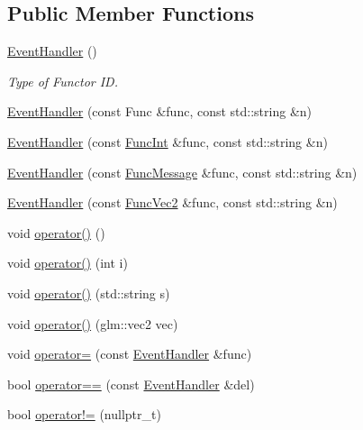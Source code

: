 \subsection*{Public Member Functions}
\begin{DoxyCompactItemize}
\item 
\hyperlink{class_event_handler_a8fe27b69582cce5c6a89a0b134bc8158}{Event\+Handler} ()
\begin{DoxyCompactList}\small\item\em Type of Functor I\+D. \end{DoxyCompactList}\item 
\hyperlink{class_event_handler_ac5aa9716cd85cf8d1a642b39da067c68}{Event\+Handler} (const Func \&func, const std\+::string \&n)
\item 
\hyperlink{class_event_handler_ab407fade3b0f1feb9e7db43007dcac0c}{Event\+Handler} (const \hyperlink{class_event_handler_afc053859d1bdb89bd10f01ff22c99fed}{Func\+Int} \&func, const std\+::string \&n)
\item 
\hyperlink{class_event_handler_a636fa04a3de981fad47973d8a4a1f419}{Event\+Handler} (const \hyperlink{class_event_handler_a21c76d0c722afe4925c87aa3544e2ce6}{Func\+Message} \&func, const std\+::string \&n)
\item 
\hyperlink{class_event_handler_aeb54e46cc16b35a2f3ced7cdc31f3d55}{Event\+Handler} (const \hyperlink{class_event_handler_a814f37c7df5b2bf170d82904b3e525d6}{Func\+Vec2} \&func, const std\+::string \&n)
\item 
void \hyperlink{class_event_handler_a45684d26fef24278c15a21894e64af18}{operator()} ()
\item 
void \hyperlink{class_event_handler_aaf68fb8408f4d2740d0086de802ac69e}{operator()} (int i)
\item 
void \hyperlink{class_event_handler_a4083d0f599c7558894810635e563cd8e}{operator()} (std\+::string s)
\item 
void \hyperlink{class_event_handler_a7c704b798b8b57610fbf194899915b28}{operator()} (glm\+::vec2 vec)
\item 
void \hyperlink{class_event_handler_a5a44f133d79f06b728b83ce005d88644}{operator=} (const \hyperlink{class_event_handler}{Event\+Handler} \&func)
\item 
bool \hyperlink{class_event_handler_a5a967210bc6305b30907418a92ce33bd}{operator==} (const \hyperlink{class_event_handler}{Event\+Handler} \&del)
\item 
bool \hyperlink{class_event_handler_a1f294dfbcd25a69b680e8647e7939c52}{operator!=} (nullptr\+\_\+t)
\end{DoxyCompactItemize}
